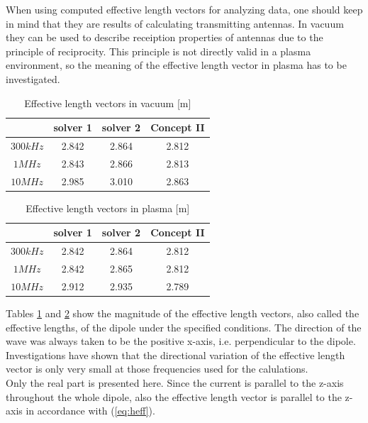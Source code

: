 \documentclass[draft,ras]{agutex}
\begin{document}
\begin{article}
When using computed effective length vectors for analyzing data, one should keep in mind that they are results of calculating transmitting antennas. In vacuum they can be used to describe receiption properties of antennas due to the principle of reciprocity. This principle is not directly valid in a plasma environment, so the meaning of the effective length vector in plasma has to be investigated.\\


\begin{table}
\caption{Effective length vectors in vacuum [m]}
\label{tab:heff_vacuum}
\begin{tabular}{|c|c|c|c|}
 \hline
 & solver 1  & solver 2  & Concept II \\
\hline
$300 kHz$ & 2.842 & 2.864 & 2.812 \\
$1 MHz$ & 2.843 & 2.866 &  2.813 \\
$10 MHz$ & 2.985 & 3.010 &  2.863  \\
\hline
\end{tabular}
\end{table}

\begin{table}
\caption{Effective length vectors in plasma [m]}
\label{tab:heff_plasma}
\begin{tabular}{|c|c|c|c|}
 \hline
 & solver 1  & solver 2  & Concept II \\
\hline
$300 kHz$ & 2.842 & 2.864 & 2.812  \\
$1 MHz$ & 2.842 & 2.865 & 2.812  \\
$10 MHz$ & 2.912 & 2.935 & 2.789 \\
\hline
\end{tabular}
\end{table}

Tables \ref{tab:heff_vacuum} and \ref{tab:heff_plasma} show the magnitude of the effective length vectors, also called the effective lengths, of the dipole under the specified conditions. The direction of the wave was always taken to be the positive x-axis, i.e. perpendicular to the dipole. Investigations have shown that the directional variation of the effective length vector is only very small at those frequencies used for the calulations.\\

Only the real part is presented here. Since the current is parallel to the z-axis throughout the whole dipole, also the effective length vector is parallel to the z-axis in accordance with (\ref{eq:heff}).\\


\end{article}
\end{document}
